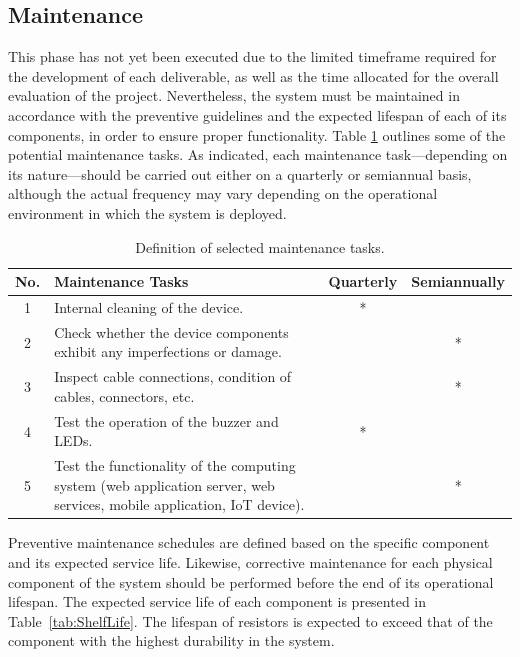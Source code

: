                 \subsection{Maintenance}
                This phase has not yet been executed due to the limited timeframe required for the development of each deliverable, as well as the time allocated for the overall evaluation of the project. Nevertheless, the system must be maintained in accordance with the preventive guidelines and the expected lifespan of each of its components, in order to ensure proper functionality. Table \ref{tab:maintenance-tasks} outlines some of the potential maintenance tasks. As indicated, each maintenance task—depending on its nature—should be carried out either on a quarterly or semiannual basis, although the actual frequency may vary depending on the operational environment in which the system is deployed.
                
                
                \begin{table}[h]
                    \centering
                    \caption{Definition of selected maintenance tasks.}
                    \label{tab:maintenance-tasks}
                    \begin{tabularx}{\textwidth}{cXcc}
                        \toprule
                        \textbf{No.} & \textbf{Maintenance Tasks} & \textbf{Quarterly} & \textbf{Semiannually} \\
                        \midrule
                        1 & Internal cleaning of the device. & * & \\
                        2 & Check whether the device components exhibit any imperfections or damage. & & * \\
                        3 & Inspect cable connections, condition of cables, connectors, etc. & & * \\
                        4 & Test the operation of the buzzer and LEDs. & * & \\
                        5 & Test the functionality of the computing system (web application server, web services, mobile application, IoT device). & & * \\
                        \bottomrule
                    \end{tabularx}
                \end{table}
                
                Preventive maintenance schedules are defined based on the specific component and its expected service life. Likewise, corrective maintenance for each physical component of the system should be performed before the end of its operational lifespan. The expected service life of each component is presented in Table~\ref{tab:ShelfLife}. The lifespan of resistors is expected to exceed that of the component with the highest durability in the system.
                
